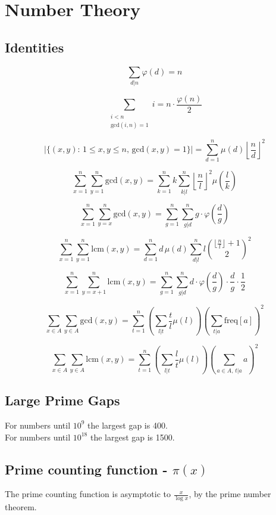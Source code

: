 \section{Number Theory}

\subsection{Identities}

$$ \sum_{d|n} \varphi(d) = n$$

$$ \sum_{\substack{i < n \\ \text{gcd}(i, n) = 1}} i = n \cdot \frac{\varphi(n)}{2} $$

$$ |\{(x, y) : \, 1 \leq x, y \leq n, \, \text{gcd}(x, y) = 1\}| = \sum_{d = 1}^n \mu(d) \left \lfloor \frac{n}{d} \right \rfloor^2$$

$$\sum_{x = 1}^n \sum_{y = 1}^n \text{gcd}(x, y)
= \sum_{k = 1}^n k \sum_{k|l}^{n} \left \lfloor \frac{n}{l} \right \rfloor^2 \mu\left(\frac{l}{k}\right)$$
    
$$\sum_{x = 1}^n \sum_{y = x}^n \text{gcd}(x, y) = \sum_{g = 1}^n \sum_{g|d}^n g \cdot \varphi\left(\frac{d}{g}\right)$$

$$\sum_{x = 1}^n \sum_{y = 1}^n \text{lcm}(x, y)
= \sum_{d = 1}^n d \, \mu(d) \sum_{d|l}^{n} l \binom{\lfloor \frac{n}{l} \rfloor + 1}{2}^2$$

$$\sum_{x = 1}^n \sum_{y = x+1}^n \text{lcm}(x, y) = \sum_{g = 1}^n \sum_{g|d}^n d \cdot \varphi\left(\frac{d}{g}\right) \cdot \frac{d}{g} \cdot \frac 1 2$$

$$\sum_{x \in A} \sum_{y \in A} \text{gcd}(x, y)
= \sum_{t = 1}^n \left(\sum_{l | t} \frac{t}{l} \mu(l)\right) \left(\sum_{t|a} \text{freq}[a]\right)^2$$

$$\sum_{x \in A} \sum_{y \in A} \text{lcm}(x, y)
= \sum_{t = 1}^n \left(\sum_{l | t} \frac{l}{t} \mu(l)\right) \left(\sum_{a \in A, \, t|a} a\right)^2$$

\subsection{Large Prime Gaps}
For numbers until $10^9$ the largest gap is 400.\\
For numbers until $10^{18}$ the largest gap is 1500.\\[0.5cm]

\subsection{Prime counting function - \texorpdfstring{$\pi(x)$}{}} The prime counting function is asymptotic to $\frac{x}{\log x}$, by the prime number theorem.

